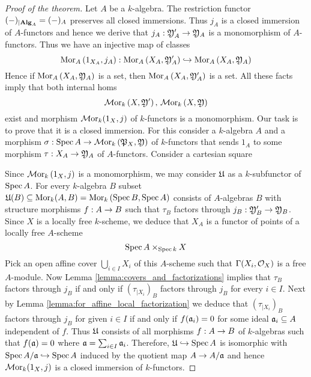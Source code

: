 \begin{proof}[Proof of the theorem]
Let $A$ be a $k$-algebra. The restriction functor $(-)_{\mid \mathbf{Alg}_A} = (-)_A$ preserves all closed immersions. Thus $j_A$ is a closed immersion of $A$-functors and hence we derive that $j_A:{\mathfrak Y}'_A\rightarrow {\mathfrak Y}_A$ is a monomorphism of $A$-functors. Thus we have an injective  map of classes
$$\mathrm{Mor}_A\left(1_{X_A},j_A\right):\mathrm{Mor}_A\left(X_A,{\mathfrak Y}'_A\right)\hookrightarrow \mathrm{Mor}_A\left(X_A,{\mathfrak Y}_A\right)$$
Hence if $\mathrm{Mor}_A\left(X_A,{\mathfrak Y}_A\right)$ is a set, then $\mathrm{Mor}_A\left(X_A,{\mathfrak Y}'_A\right)$ is a set. All these facts imply that both internal homs
$$\mathcal{M}\mathrm{or}_k\left(X,{\mathfrak Y}'\right),\,\mathcal{M}\mathrm{or}_k\left(X,{\mathfrak Y}\right)$$
exist and morphism $\mathcal{M}\mathrm{or}_k(1_{X},j)$ of $k$-functors is a monomorphism. Our task is to prove that it is a closed immersion. For this consider a $k$-algebra $A$ and a morphism $\sigma:\mathrm{Spec}\, A\rightarrow \mathcal{M}\mathrm{or}_k\left({\mathfrak P}_X,{\mathfrak Y}\right)$ of $k$-functors that sends $1_A$ to some morphism $\tau:X_A\rightarrow {\mathfrak Y}_A$ of $A$-functors. Consider a cartesian square
\begin{center}
\end{center}
Since $\mathcal{M}\mathrm{or}_k\left(1_{X},j\right)$ is a monomorphism, we may consider ${\mathfrak U}$ as a $k$-subfunctor of $\mathrm{Spec}\, A$. For every $k$-algebra $B$ subset ${\mathfrak U}(B)\subseteq \mathrm{Mor}_k(A,B)= \mathrm{Mor}_k\left(\mathrm{Spec}\, B,\mathrm{Spec}\, A\right)$ consists of $A$-algebras $B$ with structure morphisms $f:A\rightarrow B$ such that $\tau_B$ factors through $j_B:{\mathfrak Y}'_B\rightarrow {\mathfrak Y}_B$. Since $X$ is a locally free $k$-scheme, we deduce that $X_A$ is a functor of points of a locally free $A$-scheme
$$\mathrm{Spec}\, A\times_{\mathrm{Spec}\, k}X$$
Pick an open affine cover $\bigcup_{i\in I}X_i$ of this $A$-scheme such that $\Gamma(X_i,{\mathcal O}_X)$ is a free $A$-module. Now Lemma \ref{lemma:covers_and_factorizations} implies that $\tau_B$ factors through $j_B$ if and only if $\left(\tau_{\mid X_i}\right)_B$ factors through $j_B$ for every $i\in I$. Next by Lemma \ref{lemma:for_affine_local_factorization} we deduce that $\left(\tau_{\mid X_i}\right)_B$ factors through $j_B$ for given $i\in I$ if and only if $f(\mathfrak{a}_i)=0$ for some ideal $\mathfrak{a}_i\subseteq A$ independent of $f$. Thus ${\mathfrak U}$ consists of all morphisms $f:A\rightarrow B$ of $k$-algebras such that $f(\mathfrak{a})=0$ where $\mathfrak{a} = \sum_{i\in I}\mathfrak{a}_i$. Therefore, ${\mathfrak U}\hookrightarrow \mathrm{Spec}\, A$ is isomorphic with $\mathrm{Spec}\, A/\mathfrak{a}\hookrightarrow \mathrm{Spec}\, A$ induced by the quotient map $A\rightarrow A/\mathfrak{a}$ and hence $\mathcal{M}\mathrm{or}_k(1_{X},j)$ is a closed immersion of $k$-functors.
\end{proof}
